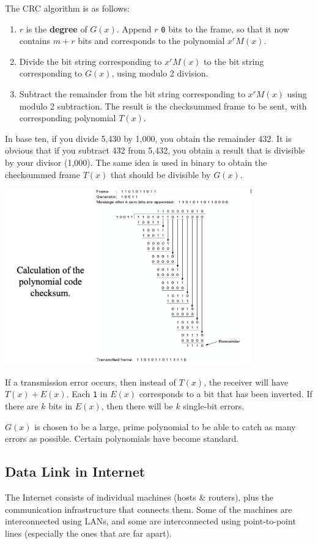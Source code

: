 \documentclass[11pt]{article}
\begin{document}
The CRC algorithm is as follows:
\begin{enumerate}
    \item   $r$ is the \textbf{degree} of $G(x)$. 
            Append $r$ \verb|0| bits to the frame, so that it now contains $m+r$ bits and corresponds to the polynomial 
            $x^rM(x)$. 
    \item   Divide the bit string corresponding to $x^rM(x)$ to the bit string corresponding to $G(x)$, using modulo 2 
            division. 
    \item   Subtract the remainder from the bit string corresponding to $x^rM(x)$ using modulo 2 subtraction. 
            The result is the checksummed frame to be sent, with corresponding polynomial $T(x)$.
\end{enumerate}

In base ten, if you divide 5,430 by 1,000, you obtain the remainder 432. 
It is obvious that if you subtract 432 from 5,432, you obtain a result that is divisible by your divisor (1,000). 
The same idea is used in binary to obtain the checksummed frame $T(x)$ that should be divisible by $G(x)$.

\begin{center}
    \includegraphics[width=0.8\textwidth]{errordetectingcodes5.png}
\end{center}

If a transmission error occurs, then instead of $T(x)$, the receiver will have $T(x) + E(x)$. 
Each \verb|1| in $E(x)$ corresponds to a bit that has been inverted. 
If there are $k$ bits in $E(x)$, then there will be $k$ single-bit errors.

$G(x)$ is chosen to be a large, prime polynomial to be able to catch as many errors as possible.
Certain polynomials have become standard.

\subsection{Data Link in Internet}
The Internet consists of individual machines (hosts \& routers), plus the communication infrastructure that connects 
them. 
Some of the machines are interconnected using LANs, and some are interconnected using point-to-point lines (especially
the ones that are far apart).
\end{document}
